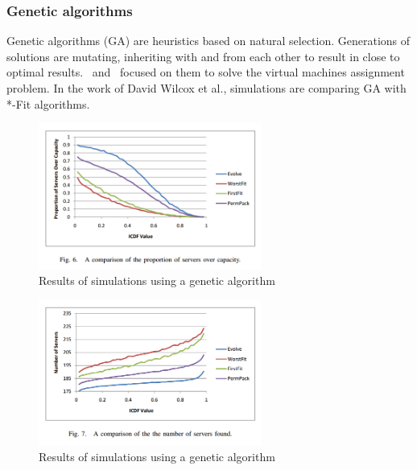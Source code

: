 \documentclass[a4paper,11pt]{article}
\begin{document}
\subsubsection{Genetic algorithms}

Genetic algorithms (GA) are heuristics based on natural selection. Generations
of solutions are mutating, inheriting with and from each other to result in
close to optimal results.~\cite{algo:genetics1} and~\cite{algo:genetics2}
focused on them to solve the virtual machines assignment problem. In the work
of David Wilcox et al.\cite{algo:genetics1}, simulations are comparing GA with
*-Fit algorithms.

\begin{figure}[b!]
\begin{center}
	\includegraphics[width=0.65\textwidth]{./images/geneticperf1.png}
	\caption{Results of simulations using a genetic algorithm\cite{algo:genetics1}}
\end{center}
\end{figure}

\begin{figure}[H]
\begin{center}
	\includegraphics[width=0.65\textwidth]{./images/geneticperf2.png}
	\caption{Results of simulations using a genetic algorithm\cite{algo:genetics1}}
\end{center}
\end{figure}
\end{document}
